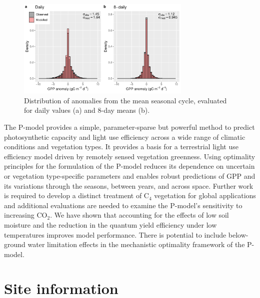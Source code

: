 \documentclass[gmd, manuscript]{copernicus}
\newcommand{\coo}{CO$_2$}
\begin{document}
\begin{figure}[t]
\includegraphics[width=8.3cm]{fig/hist_anomalies.pdf}
    \caption{Distribution of anomalies from the mean seasonal cycle, evaluated for daily values (a) and 8-day means (b).} 
    \label{fig:modobs_anomalies}
\end{figure}


\conclusions
The P-model provides a simple, parameter-sparse but powerful method to predict photosynthetic capacity and light use efficiency across a wide range of climatic conditions and vegetation types. It provides a basis for a terrestrial light use efficiency model driven by remotely sensed vegetation greenness. Using optimality principles for the formulation of the P-model reduces its dependence on uncertain or vegetation type-specific parameters and enables robust predictions of GPP and its variations through the seasons, between years, and across space. Further work is required to develop a distinct treatment of C$_4$ vegetation for global applications and additional evaluations are needed to examine the P-model's sensitivity to increasing \coo . We have shown that accounting for the effects of low soil moisture and the reduction in the quantum yield efficiency under low temperatures improves model performance. There is potential to include below-ground water limitation effects in the mechanistic optimality framework of the P-model. 


\clearpage

\appendix
\section{Site information}
\end{document}
